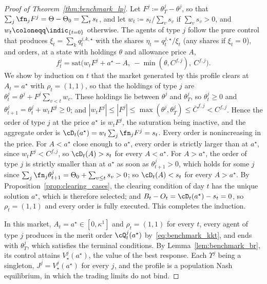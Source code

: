 \begin{proof}[Proof of Theorem~\ref{thm:benchmark_lp}]
        Let $F^j \coloneqq \theta^j_T - \theta^j$, so that $\sum_j \fn_j F^j = \Theta - \Theta_0 = \sum_t s_t$, and let $w_t \coloneqq s_t / \sum_v s_v$ if $\sum_v s_v > 0$, and $w_t \coloneqq \indic_{\{t = 0\}}$ otherwise. The agents of type $j$ follow the pure control that produces $\xi_t = \sum_k q^{j,k,\star}_t$ with the shares $\eta_t = q^{j,\star}_t / \xi_t$ (any shares if $\xi_t = 0$), and orders, at a state with holdings $\theta$ and allowance price $A$,
        $$
            f^j_t = \mathrm{sat}\big( w_t F^j + a^\star - A,\ -\min(\theta, C^{f,j}),\ C^{f,j} \big).
        $$
        We show by induction on $t$ that the market generated by this profile clears at $A_t = a^\star$ with $\rho_t = (1,1)$, so that the holdings of type $j$ are $\theta^j_t = \theta^j + F^j \sum_{v < t} w_v$. These holdings lie between $\theta^j$ and $\theta^j_T$, so $\theta^j_t \ge 0$ and $\theta^j_{t+1} = \theta^j_t + w_t F^j \ge 0$; and $|w_t F^j| \le |F^j| \le \max(\theta^j, \theta^j_T) \le \bar C^{f,j} < C^{f,j}$. Hence the order of type $j$ at the price $a^\star$ is $w_t F^j$, the saturation being inactive, and the aggregate order is $\cD_t(a^\star) = w_t \sum_j \fn_j F^j = s_t$. Every order is nonincreasing in the price. For $A < a^\star$ close enough to $a^\star$, every order is strictly larger than at $a^\star$, since $w_t F^j < C^{f,j}$, so $\cD_t(A) > s_t$ for every $A < a^\star$. For $A > a^\star$, the order of type $j$ is strictly smaller than at $a^\star$ as soon as $\theta^j_{t+1} > 0$, which holds for some $j$ since $\sum_j \fn_j \theta^j_{t+1} = \Theta_0 + \sum_{v \le t} s_v > 0$; so $\cD_t(A) < s_t$ for every $A > a^\star$. By Proposition~\ref{prop:clearing_cases}, the clearing condition of day $t$ has the unique solution $a^\star$, which is therefore selected; and $B_t - O_t = \cD_t(a^\star) - s_t = 0$, so $\rho_t = (1, 1)$ and every order is fully executed. This completes the induction.

        In this market, $A_t = a^\star \in [0, \kappa^1]$ and $\rho_t = (1,1)$ for every $t$, every agent of type $j$ produces in the merit order $\cQ^j_t(a^\star)$ by~\eqref{eq:benchmark_kkt}, and ends with $\theta^j_T$, which satisfies the terminal conditions. By Lemma~\ref{lem:benchmark_br}, its control attains $V^j_\star(a^\star)$, the value of the best response. Each $\Upsilon^j$ being a singleton, $J^j = V^j_\star(a^\star)$ for every $j$, and the profile is a population Nash equilibrium, in which the trading limits do not bind.
    \end{proof}

